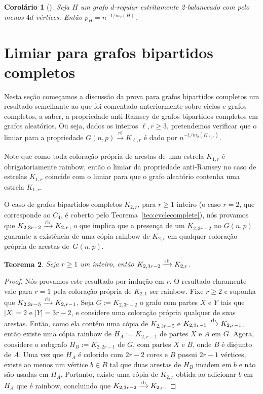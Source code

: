 \documentclass[12pt,a4paper]{book}
\newcommand{\K}{K_{\ell,r}} %
\newcommand{\rb}{\xrightarrow{\text{\rm rb}}}
\newtheorem{teorema}{Teorema}[chapter]
\newtheorem{corolario} [teorema] {Corolário}
\begin{document}
 \begin{corolario}[\cite{behague2024thresholds}]\label{cor:rbgrau}
    Seja $H$ um grafo $d$-regular estritamente 2-balanceado com pelo
menos $4d$ vértices. 
    Então $p_H = n^{-1/m_2(H)}$.    
 \end{corolario}
 

 
\section{Limiar para grafos bipartidos completos}\label{sec:limiar}

    Nesta seção começamos a discussão da prova para grafos bipartidos completos um resultado semelhante ao que foi comentado anteriormente sobre ciclos e grafos completos, a saber, a propriedade anti-Ramsey de grafos bipartidos completos em grafos aleatórios.
    Ou seja, dados os inteiros $\ell,r \geq 3$, pretendemos verificar que o limiar para a propriedade $G(n,p) \xrightarrow[]{rb} \K$ é dado por $n^{-1/m_2(\K)}$.

    Note que como toda coloração própria de arestas de uma estrela $K_{1,r}$ é obrigatoriamente rainbow, então
    o limiar da propriedade anti-Ramsey no caso de estrelas $K_{1,r}$ coincide com o limiar para que o grafo aleatório contenha uma estrela $K_{1,r}$.

    O caso de grafos bipartidos completos $K_{2,r}$, para $r\geq 1$ inteiro (o caso $r=2$, que corresponde ao $C_4$, é coberto pelo
    Teorema~\ref{teo:cyclecomplete}),
    nós provamos que $K_{2,3r-2} \rb K_{2,r}$, 
    o que implica que  a presença de um $K_{2,3r-2}$ no
    $G(n,p)$ guarante a existência de uma cópia rainbow de $K_{2,r}$ em qualquer coloração própria de arestas de~$G(n,p)$.  

     \begin{teorema}\label{teo:below} Seja $r\geq 1$ um inteiro, então
    $K_{2,3r-2} \rb K_{2,r}$.
     \end{teorema}
     \begin{proof} Nós provamos este resultado por indução em $r$. 
     O resultado claramente vale para $r=1$ pela coloração própria de $K_{2,1}$ ser rainbow. 
     Fixe $r\geq 2$ e suponha que $K_{2,3r-5} \rb K_{2,r-1}$. 
     Seja $G:=K_{2,3r-2}$ o grafo com partes $X$ e $Y$ tais que $|X|=2$ e $|Y|=3r-2$, e considere uma coloração própria qualquer de suas arestas.
     Então, como ela contém uma cópia de $K_{2,3r-5}$ e $K_{2,3r-5} \rb K_{2,r-1}$, então existe uma 
     cópia rainbow de $H_A:=K_{2,r-1}$ de partes $X$ e $A$ em $G$.
     Agora, considere  o subgrafo $H_B:=K_{2,2r-1}$ de $G$, com partes $X$ e $B$, onde $B$ é disjunto de $A$. 
     Uma vez que $H_A$ é colorido com $2r-2$ cores e $B$ possui
    $2r-1$ vértices, existe ao menos um vértice $b\in B$ tal que
    duas arestas de $H_B$ incidem em $b$ e não são usadas em $H_A$. 
    Portanto, existe uma cópia de $K_{2,r}$ obtida ao adicionar $b$ em $H_A$ que é rainbow, concluindo que  $K_{2,3r-2} \rb K_{2,r}$.
     \end{proof}
    
\end{document}
